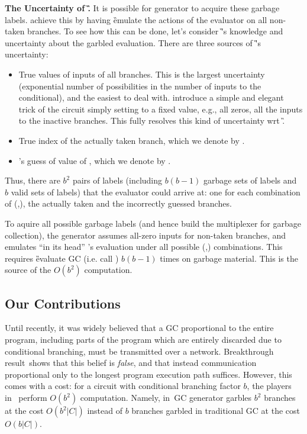 {\bf The Uncertainty of \G.}
It is possible for generator to acquire these garbage labels.  \HK achieve this by having \G  emulate the actions of the
evaluator \E on all non-taken branches.  To see how this can be done, let's consider \G's knowledge and uncertainty about the garbled evaluation.  There are three sources of \G's uncertainty:
\begin{itemize}
	\item True values of inputs of all branches.  This is the largest uncertainty (exponential number of possibilities in the number of inputs to the conditional), and the easiest to deal with.  \HK introduce a simple and elegant trick of the circuit simply setting to a fixed value, e.g., all zeros, all the inputs to the inactive branches.  This fully resolves this kind of uncertainty wrt \G.
	\item True index of the actually taken branch, which we denote by \truth.
	\item \E's guess of value of \truth, which we denote by \guess.
\end{itemize}

Thus, there are $b^2$ pairs of labels (including  $b(b-1)$ garbage sets of labels and $b$ valid sets of labels)  that the evaluator
could arrive at: one for each combination of (\truth,\guess), the  actually taken  and
the incorrectly guessed branches. 
%


To aquire all possible garbage labels (and hence build the multiplexer for garbage collection), the \HK generator assumes all-zero inputs for non-taken branches, and emulates ``in its head'' \E's evaluation under all possible (\truth,\guess) combinations.  
This requires \G evaluate GC (i.e. call \Ev) $b(b-1)$ times on garbage material.
This is the source of the $O(b^2)$ computation.






\subsection{Our Contributions}
\label{sec:ourContrib}

Until recently, it was widely believed that a GC
proportional to the entire program, including parts of the program
which are entirely discarded due to conditional branching, must
be transmitted over a network.
Breakthrough result~\HK shows that this belief is \emph{false}, and that instead
communication proportional only to the longest program execution
path suffices.  However, this comes with a cost:
for a circuit with conditional branching factor $b$, the players in~\HK 
perform $O(b^2)$ computation.  Namely, in~\HK GC generator garbles $b^2$ branches at the cost $O(b^2|C|)$  instead of $b$ branches garbled in traditional GC at the cost $O(b|C|)$.

